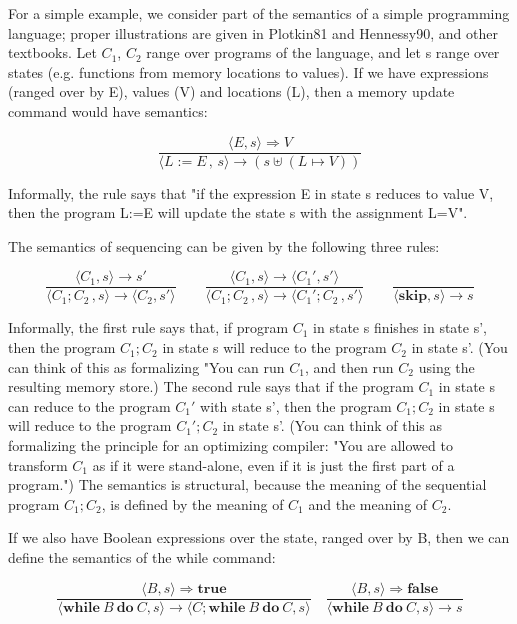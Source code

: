 \documentclass[12pt,b5paper]{book}
\theoremstyle{definition}
\begin{document}
For a simple example, we consider part of the semantics of a simple programming language; proper illustrations are given in Plotkin81 and Hennessy90, and other textbooks. Let $C_1$, $C_2$ range over programs of the language, and let s range over states (e.g. functions from memory locations to values). If we have expressions (ranged over by E), values (V) and locations (L), then a memory update command would have semantics:

$$\frac{\langle E,s\rangle \Rightarrow V}{\langle L:=E\,,\,s\rangle\longrightarrow (s\uplus (L\mapsto V))}$$

Informally, the rule says that "if the expression E in state s reduces to value V, then the program L:=E will update the state s with the assignment L=V".

The semantics of sequencing can be given by the following three rules:

$$\frac{\langle C_1,s\rangle \longrightarrow s'} {\langle C_1;C_2 \,,s\rangle\longrightarrow \langle C_2, s'\rangle} \quad\quad \frac{\langle C_1,s\rangle \longrightarrow \langle C_1',s'\rangle} {\langle C_1;C_2 \,,s\rangle\longrightarrow \langle C_1';C_2\,, s'\rangle} \quad\quad \frac{} {\langle \mathbf{skip} ,s\rangle\longrightarrow s}$$

Informally, the first rule says that, if program $C_1$ in state s finishes in state s', then the program $C_1;C_2$ in state s will reduce to the program $C_2$ in state s'. (You can think of this as formalizing "You can run $C_1$, and then run $C_2$ using the resulting memory store.) The second rule says that if the program $C_1$ in state s can reduce to the program $C_1'$ with state s', then the program $C_1;C_2$ in state s will reduce to the program $C_1';C_2$ in state s'. (You can think of this as formalizing the principle for an optimizing compiler: "You are allowed to transform $C_1$ as if it were stand-alone, even if it is just the first part of a program.") The semantics is structural, because the meaning of the sequential program $C_1;C_2$, is defined by the meaning of $C_1$ and the meaning of $C_2$.

If we also have Boolean expressions over the state, ranged over by B, then we can define the semantics of the while command: 

$$\frac{\langle B,s\rangle \Rightarrow \mathbf{true}}{\langle\mathbf{while}\ B\ \mathbf{ do }\ C,s\rangle\longrightarrow \langle C;\mathbf{while}\ B\ \mathbf{do}\ C,s\rangle} \quad \frac{\langle B,s\rangle \Rightarrow \mathbf{false}}{\langle\mathbf{while}\ B\ \mathbf{ do }\ C,s\rangle\longrightarrow s} $$
\end{document}
